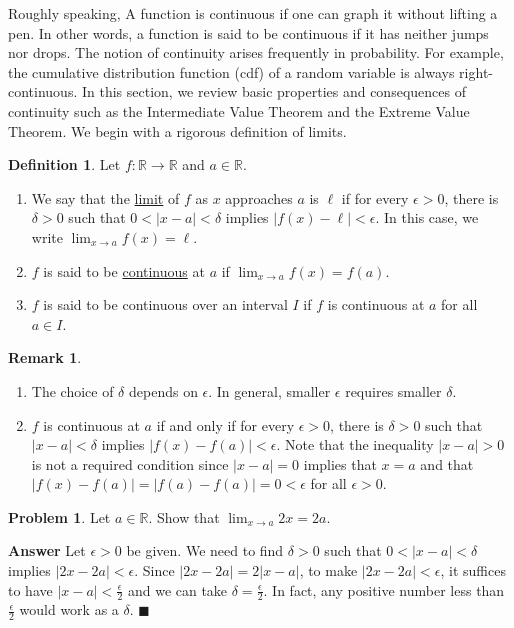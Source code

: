 \documentclass[12pt,letterpaper]{book}
\numberwithin{equation}{section}
\theoremstyle{definition}
\newtheorem{defi}[thm]{\textbf{Definition}}
\newtheorem{problem}[thm]{\textbf{Problem}}
\newtheorem{remark}[thm]{\textbf{Remark}}
\newenvironment{answer}{\noindent\textbf{Answer}}{\hfill$\blacksquare$\vspace{0.1in}}
\begin{document}
Roughly speaking, A function is continuous if one can graph it without lifting a pen. In other words, a function is said to be continuous if it has neither jumps nor drops. The notion of continuity arises frequently in probability. For example, the cumulative distribution function (cdf) of a random variable is always right-continuous. In this section, we review basic properties and consequences of continuity such as the Intermediate Value Theorem and the Extreme Value Theorem. We begin with a rigorous definition of limits.

\begin{defi}\label{ft cts defi} Let $f:\mathbb{R}\to \mathbb{R}$ and $a\in \mathbb{R}$.
\begin{enumerate}
\item We say that the \underline{limit} of $f$ as $x$ approaches $a$ is $\ell$ if for every $\epsilon>0$, there is $\delta>0$ such that
$0<|x-a|<\delta$ implies $|f(x)-\ell|<\epsilon$. In this case, we write $\displaystyle{\lim_{x\to a} f(x)=\ell}$.
\item $f$ is said to be \underline{continuous} at $a$ if $\displaystyle{\lim_{x\to a} f(x)=f(a)}$.
\item $f$ is said to be continuous over an interval $I$ if $f$ is continuous at $a$ for all $a\in I$.
\end{enumerate}
\end{defi}

\begin{remark}\quad
\begin{enumerate}
\item The choice of $\delta$ depends on $\epsilon$. In general, smaller $\epsilon$ requires smaller $\delta$.
\item $f$ is continuous at $a$ if and only if for every $\epsilon>0$, there is $\delta>0$ such that $|x-a|<\delta$ implies $|f(x)-f(a)|<\epsilon$. Note that the inequality $|x-a|>0$ is not a required condition since $|x-a|=0$ implies that $x=a$ and that $|f(x)-f(a)|=|f(a)-f(a)|=0<\epsilon$ for all $\epsilon>0$.
\end{enumerate}
\end{remark}

\begin{problem}\label{limit of 2x}
Let $a\in \mathbb{R}$. Show that $\displaystyle{\lim_{x\to a}2x=2a}$.
\end{problem}

\begin{answer}
Let $\epsilon >0$ be given. We need to find $\delta>0$ such that $0<|x-a|<\delta$ implies $|2x-2a|<\epsilon$. Since $|2x-2a|=2|x-a|$, to make $|2x-2a|<\epsilon$, it suffices to have $|x-a|<\frac{\epsilon}{2}$ and we can take $\delta=\frac{\epsilon}{2}$. In fact, any positive number less than $\frac{\epsilon}{2}$ would work as a $\delta$.
\end{answer}
\end{document}
